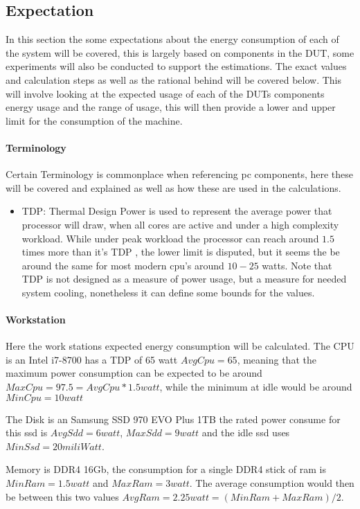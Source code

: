 \subsection{Expectation}
In this section the some expectations about the energy consumption of each of the system will be covered, this is largely based on components in the DUT, some experiments will also be conducted to support the estimations. The exact values and calculation steps as well as the rational behind will be covered below. This will involve looking at the expected usage of each of the DUTs components energy usage and the range of usage, this will then provide a lower and upper limit for the consumption of the machine.

\paragraph{Terminology}
Certain Terminology is commonplace when referencing pc components, here these will be covered and explained as well as how these are used in the calculations.
\begin{itemize}
    \item TDP: Thermal Design Power is used to represent the average power that processor will draw, when all cores are active and under a high complexity workload. While under peak workload the processor can reach around $1.5$ times more than it's TDP \cite{hennessy2011computer}, the lower limit is disputed, but it seems the be around the same for most modern cpu's around $10-25$ watts. Note that TDP is not designed as a measure of power usage, but a measure for needed system cooling, nonetheless it can define some bounds for the values.
\end{itemize}

\paragraph{Workstation}
Here the work stations expected energy consumption will be calculated.
The CPU is an Intel i7-8700 has a TDP of 65 watt $AvgCpu = 65$, meaning that the maximum power consumption can be expected to be around $MaxCpu=97.5=AvgCpu*1.5 watt$, while the minimum at idle would be around $MinCpu=10 watt$

The Disk is an Samsung SSD 970 EVO Plus 1TB the rated power consume for this ssd is $AvgSdd = 6 watt$, $MaxSdd = 9 watt$ and the idle ssd uses $MinSsd = 20 miliWatt$.

Memory is DDR4 16Gb, the consumption for a single DDR4 stick of ram is $MinRam=1.5 watt$ and $MaxRam=3 watt$. The average consumption would then be between this two values $AvgRam=2.25 watt=(MinRam+MaxRam)/2$.

